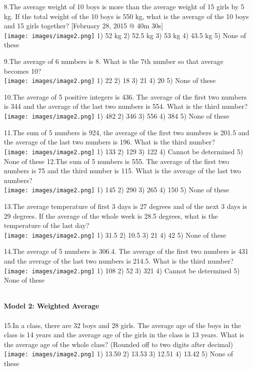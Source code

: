 \documentclass[
]{article}
\begin{document}
8.The average weight of 10 boys is more than the average weight of 15 girls by 5 kg. If the total weight of the 10 boys is 550 kg, what is the average of the 10 boys and 15 girls together? [February 28, 2015 @ 40m 30s]  \\
\texttt{[image: images/image2.png]}   1) 52 kg 2) 52.5 kg 3) 53 kg 4) 43.5 kg 5) None of these

9.The average of 6 numbers is 8. What is the 7th number so that average becomes 10?  \\
\texttt{[image: images/image2.png]}   1) 22 	2) 18 	3) 21 	4) 20 	5) None of these

10.The average of 5 positive integers is 436. The average of the first two numbers is 344 and the average of the last two numbers is 554. What is the third number?  \\
\texttt{[image: images/image2.png]}  1) 482 	2) 346 	3) 556 	4) 384 	5) None of these

11.The sum of 5 numbers is 924, the average of the first two numbers is 201.5 and the average of the last two numbers is 196. What is the third number?  \\
\texttt{[image: images/image2.png]}  1) 133 2) 129 3) 122 4) Cannot be determined 5) None of these
\newpage
12.The sum of 5 numbers is 555. The average of the first two numbers is 75 and the third number is 115. What is the average of the last two numbers? \\
\texttt{[image: images/image2.png]}   1) 145 	2) 290 	3) 265 	4) 150 	5) None of these

13.The average temperature of first 3 days is 27 degrees and of the next 3 days is 29 degrees. If the average of the whole week is 28.5 degrees, what is the temperature of the last day?  \\
\texttt{[image: images/image2.png]}   1) 31.5 	2) 10.5 	3) 21 	4) 42 	5) None of these 

14.The average of 5 numbers is 306.4. The average of the first two numbers is 431 and the average of the last two numbers is 214.5. What is the third number?  \\
\texttt{[image: images/image2.png]}   1) 108 2) 52 3) 321 4) Cannot be determined 5) None of these

\textbf{\\ Model 2: Weighted Average \\}
\\ 15.In a class, there are 32 boys and 28 girls. The average age of the boys in the class is 14 years and the average age of the girls in the class is 13 years. What is the average age of the whole class? (Rounded off to two digits after decimal)  \\
\texttt{[image: images/image2.png]}   1) 13.50 	2) 13.53 	3) 12.51 	4) 13.42 	5) None of these
\end{document}

